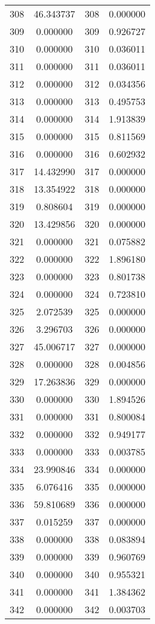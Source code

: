 \documentclass[12pt]{article}
\begin{document}
\begin{longtable}{@{}cccc@{}}
308 & 46.343737 & 308 & 0.000000 \\
309 & 0.000000 & 309 & 0.926727 \\
310 & 0.000000 & 310 & 0.036011 \\
311 & 0.000000 & 311 & 0.036011 \\
312 & 0.000000 & 312 & 0.034356 \\
313 & 0.000000 & 313 & 0.495753 \\
314 & 0.000000 & 314 & 1.913839 \\
315 & 0.000000 & 315 & 0.811569 \\
316 & 0.000000 & 316 & 0.602932 \\
317 & 14.432990 & 317 & 0.000000 \\
318 & 13.354922 & 318 & 0.000000 \\
319 & 0.808604 & 319 & 0.000000 \\
320 & 13.429856 & 320 & 0.000000 \\
321 & 0.000000 & 321 & 0.075882 \\
322 & 0.000000 & 322 & 1.896180 \\
323 & 0.000000 & 323 & 0.801738 \\
324 & 0.000000 & 324 & 0.723810 \\
325 & 2.072539 & 325 & 0.000000 \\
326 & 3.296703 & 326 & 0.000000 \\
327 & 45.006717 & 327 & 0.000000 \\
328 & 0.000000 & 328 & 0.004856 \\
329 & 17.263836 & 329 & 0.000000 \\
330 & 0.000000 & 330 & 1.894526 \\
331 & 0.000000 & 331 & 0.800084 \\
332 & 0.000000 & 332 & 0.949177 \\
333 & 0.000000 & 333 & 0.003785 \\
334 & 23.990846 & 334 & 0.000000 \\
335 & 6.076416 & 335 & 0.000000 \\
336 & 59.810689 & 336 & 0.000000 \\
337 & 0.015259 & 337 & 0.000000 \\
338 & 0.000000 & 338 & 0.083894 \\
339 & 0.000000 & 339 & 0.960769 \\
340 & 0.000000 & 340 & 0.955321 \\
341 & 0.000000 & 341 & 1.384362 \\
342 & 0.000000 & 342 & 0.003703 \\

\end{longtable}
\end{document}
